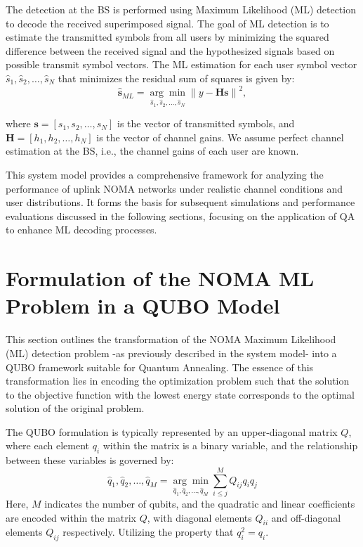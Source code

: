 The detection at the BS is performed using Maximum Likelihood (ML) detection to decode the received superimposed signal. The goal of ML detection is to estimate the transmitted symbols from all users by minimizing the squared difference between the received signal and the hypothesized signals based on possible transmit symbol vectors. The ML estimation for each user symbol vector ${\hat{s}_1, \hat{s}_2, \ldots, \hat{s}_N}$ that minimizes the residual sum of squares is given by:
\begin{equation}
    \hat{\mathbf{s}}_{ML} = \underset{\hat{s}_1, \hat{s}_2, \ldots, \hat{s}_N}{\arg \min} \left\| y - \mathbf{H}\mathbf{s} \right\|^2,
\end{equation}

where $\mathbf{s} = [s_1, s_2, \ldots, s_N]$ is the vector of transmitted symbols, and $\mathbf{H} = [h_1, h_2, \ldots, h_N]$ is the vector of channel gains. We assume perfect channel estimation at the BS, i.e., the channel gains of each user are known. 

This system model provides a comprehensive framework for analyzing the performance of uplink NOMA networks under realistic channel conditions and user distributions. It  forms the basis for subsequent simulations and performance evaluations discussed in the following sections, focusing on the application of QA to enhance ML decoding processes.

\section{Formulation of the NOMA ML Problem in a QUBO Model}
This section outlines the transformation of the NOMA Maximum Likelihood (ML) detection problem -as previously described in the system model- into a QUBO framework suitable for Quantum Annealing. 
The essence of this transformation lies in encoding the optimization problem such that the solution to the objective function with the lowest energy state corresponds to the optimal solution of the original problem.

The QUBO formulation is typically represented by an upper-diagonal matrix \(Q\), where each element \(q_i\) within the matrix is a binary variable, and the relationship between these variables is governed by:
\begin{equation}
\hat{q}_1, \hat{q}_2, \ldots, \hat{q}_M = \underset{\hat{q}_1, \hat{q}_2, \ldots, \hat{q}_M}{\arg \min} \sum_{i \leq j}^{M} Q_{ij} q_i q_j
\label{qubo}\end{equation}
Here, \(M\) indicates the number of qubits, and the quadratic and linear coefficients are encoded within the matrix \(Q\), with diagonal elements \(Q_{ii}\) and off-diagonal elements \(Q_{ij}\) respectively. Utilizing the property that \(q_i^2 = q_i\).

